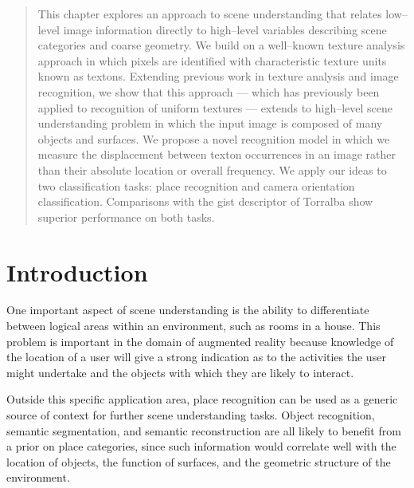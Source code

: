 \begin{quote}
  This chapter explores an approach to scene understanding that
  relates low--level image information directly to high--level
  variables describing scene categories and coarse geometry. We
  build on a well--known texture analysis approach in which pixels are
  identified with characteristic texture units known as
  textons. Extending previous work in texture analysis and image
  recognition, we show that this approach --- which has previously been
  applied to recognition of uniform textures --- extends to 
  high--level scene understanding problem in which the input image is
  composed of many objects and surfaces. We propose a novel
  recognition model in which we measure the displacement between
  texton occurrences in an image rather than their absolute location
  or overall frequency. We apply our ideas to two classification
  tasks: place recognition and camera orientation
  classification. Comparisons with the gist descriptor of Torralba
  \etal show superior performance on both tasks.\footnotemark
\end{quote}


\section{Introduction}
One important aspect of scene understanding is the ability to
differentiate between logical areas within an environment, such as
rooms in a house. This problem is important in the domain of augmented
reality because knowledge of the location of a user will give a strong
indication as to the activities the user might undertake and the
objects with which they are likely to interact. 

Outside this specific application area, place recognition can be used
as a generic source of context for further scene understanding
tasks. Object recognition, semantic segmentation, and semantic
reconstruction are all likely to benefit from a prior on place
categories, since such information would correlate well with the
location of objects, the function of surfaces, and the geometric
structure of the environment.

